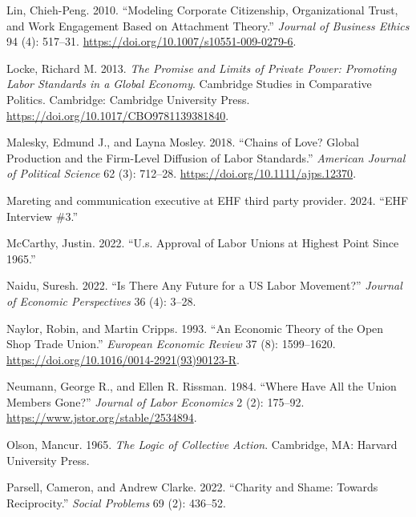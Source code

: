 \documentclass[
  11pt,
  oneside]{article}
\newlength{\cslhangindent}
\newenvironment{CSLReferences}[2] %
 {\begin{list}{}{%
  \setlength{\itemindent}{0pt}
  \setlength{\leftmargin}{0pt}
  \setlength{\parsep}{0pt}
  \ifodd #1
   \setlength{\leftmargin}{\cslhangindent}
   \setlength{\itemindent}{-1\cslhangindent}
  \fi
  \setlength{\itemsep}{#2\baselineskip}}}
 {\end{list}}
\begin{document}
\begin{CSLReferences}{1}{0}
Lin, Chieh-Peng. 2010. {``Modeling {Corporate} {Citizenship}, {Organizational} {Trust}, and {Work} {Engagement} {Based} on {Attachment} {Theory}.''} \emph{Journal of Business Ethics} 94 (4): 517--31. \url{https://doi.org/10.1007/s10551-009-0279-6}.

Locke, Richard M. 2013. \emph{The {Promise} and {Limits} of {Private} {Power}: {Promoting} {Labor} {Standards} in a {Global} {Economy}}. Cambridge {Studies} in {Comparative} {Politics}. Cambridge: Cambridge University Press. \url{https://doi.org/10.1017/CBO9781139381840}.

Malesky, Edmund J., and Layna Mosley. 2018. {``Chains of {Love}? {Global} {Production} and the {Firm}-{Level} {Diffusion} of {Labor} {Standards}.''} \emph{American Journal of Political Science} 62 (3): 712--28. \url{https://doi.org/10.1111/ajps.12370}.

Mareting and communication executive at EHF third party provider. 2024. {``{EHF} Interview \#3.''}

McCarthy, Justin. 2022. {``U.s. Approval of Labor Unions at Highest Point Since 1965.''}

Naidu, Suresh. 2022. {``Is There Any Future for a {US} {Labor} {Movement}?''} \emph{Journal of Economic Perspectives} 36 (4): 3--28.

Naylor, Robin, and Martin Cripps. 1993. {``An Economic Theory of the Open Shop Trade Union.''} \emph{European Economic Review} 37 (8): 1599--1620. \url{https://doi.org/10.1016/0014-2921(93)90123-R}.

Neumann, George R., and Ellen R. Rissman. 1984. {``Where {Have All} the {Union Members Gone}?''} \emph{Journal of Labor Economics} 2 (2): 175--92. \url{https://www.jstor.org/stable/2534894}.

Olson, Mancur. 1965. \emph{The {Logic} of {Collective} {Action}}. Cambridge, MA: Harvard University Press.

Parsell, Cameron, and Andrew Clarke. 2022. {``Charity and Shame: Towards Reciprocity.''} \emph{Social Problems} 69 (2): 436--52.


\end{CSLReferences}
\end{document}
